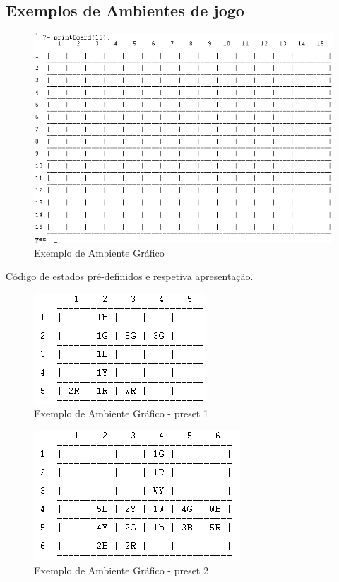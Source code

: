 \documentclass[a4paper]{article}
\begin{document}
	\newpage
	\subsection{Exemplos de Ambientes de jogo}
	
	\begin{figure}[h!]
	\begin{center}
	\includegraphics[scale=0.7]{./res/example_1.png}
	\caption{Exemplo de Ambiente Gráfico}
	\label{fig:example1}
	\end{center}
	\end{figure}
	
	\newpage
	
	Código de estados pré-definidos e respetiva apresentação.
	
	\footnotesize
	\lstset{language=Prolog}
	
	\normalsize
	
	\begin{figure}[h!]
	\begin{center}
	\includegraphics[scale=0.7]{./res/example_2.png}
	\caption{Exemplo de Ambiente Gráfico - preset 1}
	\label{fig:example2}
	\end{center}
	\end{figure}
	
	\begin{figure}[h!]
	\begin{center}
	\includegraphics[scale=0.7]{./res/example_3.png}
	\caption{Exemplo de Ambiente Gráfico - preset 2}
	\label{fig:example3}
	\end{center}
	\end{figure}
		
	
	
\end{document}
